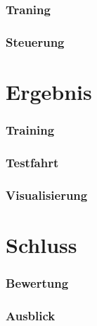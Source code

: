 \documentclass{beamer}
\begin{document}
\begin{frame}
\frametitle{Traning}

\end{frame}

\begin{frame}
\frametitle{Steuerung}

\end{frame}


\section{Ergebnis}

\begin{frame}
\frametitle{Training}

\end{frame}


\begin{frame}
\frametitle{Testfahrt}

\end{frame}

\begin{frame}
\frametitle{Visualisierung}

\end{frame}

\section{Schluss}

\begin{frame}
\frametitle{Bewertung}

\end{frame}

\begin{frame}
\frametitle{Ausblick}

\end{frame}
\end{document}
